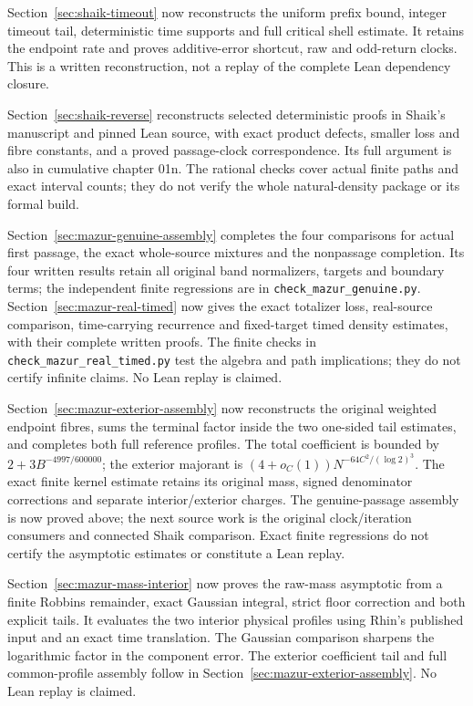 \documentclass[11pt]{article}
\theoremstyle{remark}\newtheorem{remark}[proposition]{Remark}
\begin{document}
Section~\ref{sec:shaik-timeout} now reconstructs the uniform prefix
bound, integer timeout tail, deterministic time supports and full critical
shell estimate. It retains the endpoint rate and proves additive-error
shortcut, raw and odd-return clocks. This is a written reconstruction,
not a replay of the complete Lean dependency closure.

Section~\ref{sec:shaik-reverse} reconstructs selected deterministic
proofs in Shaik's manuscript and pinned Lean source, with exact product
defects, smaller loss and fibre constants, and a proved passage-clock
correspondence. Its full argument is also in cumulative chapter 01n.
The rational checks cover actual finite paths and exact interval counts;
they do not verify the whole natural-density package or its formal build.


Section~\ref{sec:mazur-genuine-assembly} completes the four comparisons
for actual first passage, the exact whole-source mixtures and the
nonpassage completion. Its four written results retain all original
band normalizers, targets and boundary terms; the independent finite
regressions are in \texttt{check\_mazur\_genuine.py}.
Section~\ref{sec:mazur-real-timed} now gives the exact totalizer loss,
real-source comparison, time-carrying recurrence and fixed-target
timed density estimates, with their complete written proofs.
The finite checks in \texttt{check\_mazur\_real\_timed.py} test the
algebra and path implications; they do not certify infinite claims.
No Lean replay is claimed.

Section~\ref{sec:mazur-exterior-assembly} now reconstructs the original
weighted endpoint fibres, sums the terminal factor inside the two
one-sided tail estimates, and completes both full reference profiles.
The total coefficient is bounded by $2+3B^{-4997/600000}$; the
exterior majorant is $(4+o_C(1))N^{-64C^2/(\log2)^3}$.
The exact finite kernel estimate retains its original mass, signed
denominator corrections and separate interior/exterior charges.
The genuine-passage assembly is now proved above; the next source work
is the original clock/iteration consumers and connected Shaik comparison.
Exact finite regressions do not certify
the asymptotic estimates or constitute a Lean replay.

Section~\ref{sec:mazur-mass-interior} now proves the raw-mass
asymptotic from a finite Robbins remainder, exact Gaussian integral,
strict floor correction and both explicit tails. It evaluates the two
interior physical profiles using Rhin's published input and an exact
time translation. The Gaussian comparison sharpens the logarithmic
factor in the component error. The exterior coefficient tail and full
common-profile assembly follow in Section~\ref{sec:mazur-exterior-assembly}.
No Lean replay is claimed.
\end{document}
